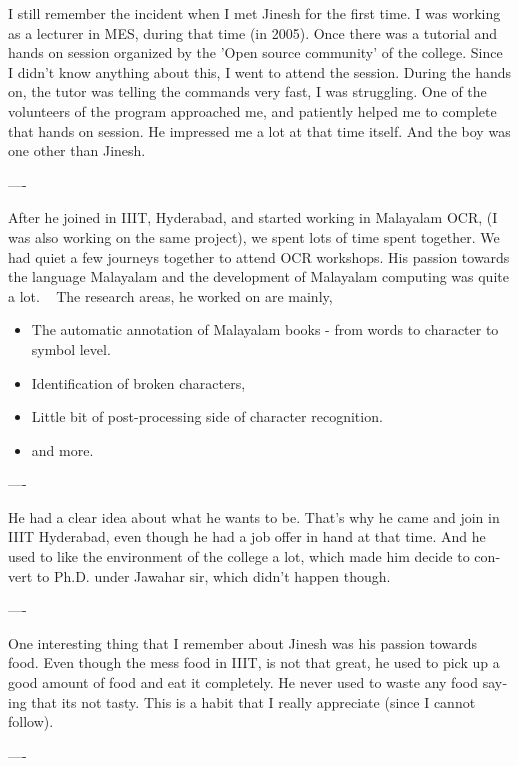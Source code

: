 \newpage
\begin{english}
I still remember the incident when I met Jinesh for the first time. I was working as a lecturer in MES, during that time (in 2005). Once there was a tutorial and hands on session organized by the 'Open source community' of the college. Since I didn’t know anything about this, I went to attend the session. During the hands on, the tutor was telling the commands very fast, I was struggling. One of the volunteers of the program approached me, and patiently helped me to complete that hands on session. He impressed me a lot at that time itself. And the boy was one other than Jinesh.
\begin{center}
---- 
\end{center}
After he joined in IIIT, Hyderabad, and started working in Malayalam OCR, (I was also working on the same project), we spent lots of time spent together. We had quiet a few journeys together to attend OCR workshops. His passion towards the language Malayalam and the development of Malayalam computing was quite a lot.
 
The research areas, he worked on are mainly,
\begin{itemize}
\item The automatic annotation of Malayalam books - from words to character to symbol level.
\item Identification of broken characters,
\item Little bit of post-processing side of character recognition.
\item and more.
\end{itemize}
\begin{center}
---- 
\end{center}
He had a clear idea about what he wants to be. That’s why he came and join in IIIT Hyderabad, even though he had a job offer in hand at that time. And he used to like the environment of the college a lot, which made him decide to convert to Ph.D. under Jawahar sir, which didn’t happen though.
\begin{center}
---- 
\end{center}
One interesting thing that I remember about Jinesh was his passion towards food. Even though the mess food in IIIT, is not that great, he used to pick up a good amount of food and eat it completely. He never used to waste any food saying that its not tasty. This is a habit that I really appreciate (since I cannot follow).
\begin{center}
---- 
\end{center}

\end{english}
